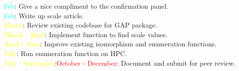\documentclass[preview]{standalone}
\begin{document}
\textcolor{cyan}{Feb}: Give a nice compliment to the confirmation panel.\\\textcolor{cyan}{Feb}: Write up scale article.\\\textcolor{yellow}{March}: Review existing codebase for GAP package.\\\textcolor{yellow}{March - April}: Implement function to find scale values.\\\textcolor{yellow}{April - June}: Improve existing isomorphism and enumeration functions.\\\textcolor{yellow}{July}: Run enumeration function on HPC.\\\textcolor{yellow}{July - September}:\textcolor{red}{October - December}: Document and submit for peer review.\\
\end{document}
